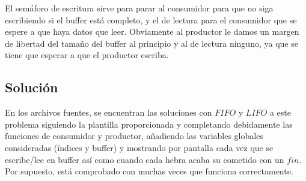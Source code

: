 \documentclass[11pt]{article}
\theoremstyle{ejercicio-style}
\begin{document}
El semáforo de escritura sirve para parar al consumidor para que no siga escribiendo si el buffer está completo, y el de lectura para el consumidor que se espere a que haya datos que leer. Obviamente al productor le damos un margen de libertad del tamaño del buffer al principio y al de lectura ninguno, ya que se tiene que esperar a que el productor escriba.

\subsection*{Solución}
\label{sec::solucion}
En los archivos fuentes, se encuentran las soluciones con $FIFO$ y $LIFO$ a este problema siguiendo la plantilla proporcionada y completando debidamente las funciones de consumidor y productor, añadiendo las variables globales consideradas (índices y buffer) y mostrando por pantalla cada vez que se escribe/lee en buffer así como cuando cada hebra acaba su cometido con un $fin$. Por supuesto, está comprobado con muchas veces que funciona correctamente.
\end{document}
